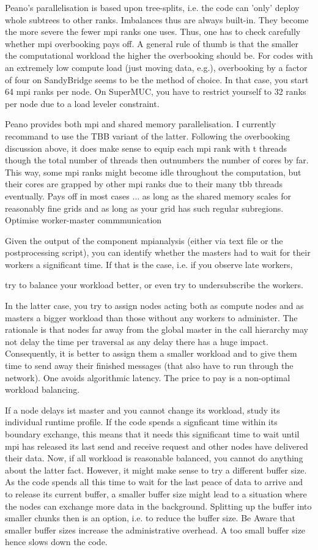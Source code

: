 Peano's parallelisation is based upon tree-splits, i.e. the code can 'only' deploy whole subtrees to other ranks. Imbalances thus are always built-in. They become the more severe the fewer mpi ranks one uses. Thus, one has to check carefully whether mpi overbooking pays off. A general rule of thumb is that the smaller the computational workload the higher the overbooking should be. For codes with an extremely low compute load (just moving data, e.g.), overbooking by a factor of four on SandyBridge seems to be the method of choice. In that case, you start 64 mpi ranks per node. On SuperMUC, you have to restrict yourself to 32 ranks per node due to a load leveler constraint.

Peano provides both mpi and shared memory parallelisation. I currently recommand to use the TBB variant of the latter. Following the overbooking discussion above, it does make sense to equip each mpi rank with t threads though the total number of threads then outnumbers the number of cores by far. This way, some mpi ranks might become idle throughout the computation, but their cores are grapped by other mpi ranks due to their many tbb threads eventually. Pays off in most cases ... as long as the shared memory scales for reasonably fine grids and as long as your grid has such regular subregions.
Optimise worker-master commmunication

Given the output of the component mpianalysis (either via text file or the postprocessing script), you can identify whether the masters had to wait for their workers a significant time. If that is the case, i.e. if you observe late workers,

    try to balance your workload better, or
    even try to undersubscribe the workers.

In the latter case, you try to assign nodes acting both as compute nodes and as masters a bigger workload than those without any workers to administer. The rationale is that nodes far away from the global master in the call hierarchy may not delay the time per traversal as any delay there has a huge impact. Consequently, it is better to assign them a smaller workload and to give them time to send away their finished messages (that also have to run through the network). One avoids algorithmic latency. The price to pay is a non-optimal workload balancing.

If a node delays ist master and you cannot change its workload, study its individual runtime profile. If the code spends a signficant time within its boundary exchange, this means that it needs this significant time to wait until mpi has released its last send and receive request and other nodes have delivered their data. Now, if all workload is reasonable balanced, you cannot do anything about the latter fact. However, it might make sense to try a different buffer size. As the code spends all this time to wait for the last peace of data to arrive and to release its current buffer, a smaller buffer size might lead to a situation where the nodes can exchange more data in the background. Splitting up the buffer into smaller chunks then is an option, i.e. to reduce the buffer size. Be Aware that smaller buffer sizes increase the administrative overhead. A too small buffer size hence slows down the code.

